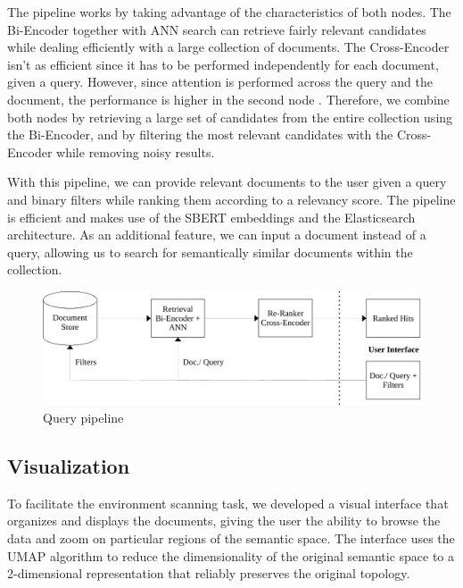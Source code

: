 \documentclass[a4paper]{article}
\begin{document}
The pipeline works by taking advantage of the characteristics of both nodes. The Bi-Encoder together with ANN search can retrieve fairly relevant candidates while dealing efficiently with a large collection of documents. The Cross-Encoder isn't as efficient since it has to be performed independently for each document, given a query. However, since attention is performed across the query and the document, the performance is higher in the second node \citep{humeau2019}. Therefore, we combine both nodes by retrieving a large set of candidates from the entire collection using the Bi-Encoder, and by filtering the most relevant candidates with the Cross-Encoder while removing noisy results.

With this pipeline, we can provide relevant documents to the user given a query and binary filters while ranking them according to a relevancy score. The pipeline is efficient and makes use of the SBERT embeddings and the Elasticsearch architecture. As an additional feature, we can input a document instead of a query, allowing us to search for semantically similar documents within the collection.

\begin{figure}[H]
  \centering
  \includegraphics[scale=0.7]{./assets/query_pipeline}
  \caption{Query pipeline}
  \label{query_pipeline}
\end{figure}

\subsection{Visualization}
To facilitate the environment scanning task, we developed a visual interface that organizes and displays the documents, giving the user the ability to browse the data and zoom on particular regions of the semantic space. The interface uses the UMAP algorithm to reduce the dimensionality of the original semantic space to a 2-dimensional representation that reliably preserves the original topology.
\end{document}
